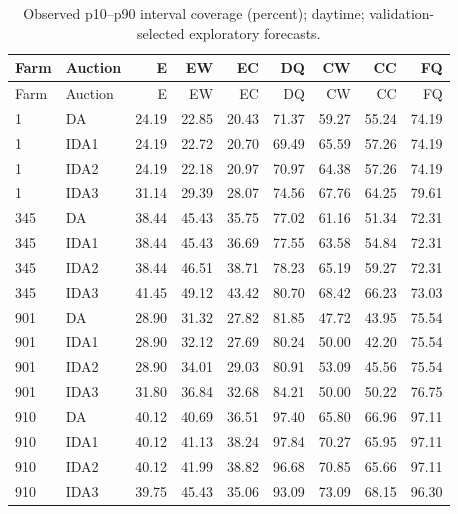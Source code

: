 \documentclass[11pt,a4paper]{article}
\begin{document}
\begin{longtable}{llrrrrrrr}
\caption{Observed p10--p90 interval coverage (percent); daytime; validation-selected exploratory forecasts.}\\
\toprule Farm & Auction & E & EW & EC & DQ & CW & CC & FQ \\
\midrule\endfirsthead
\toprule Farm & Auction & E & EW & EC & DQ & CW & CC & FQ \\
\midrule\endhead
1 & DA & 24.19 & 22.85 & 20.43 & 71.37 & 59.27 & 55.24 & 74.19 \\
1 & IDA1 & 24.19 & 22.72 & 20.70 & 69.49 & 65.59 & 57.26 & 74.19 \\
1 & IDA2 & 24.19 & 22.18 & 20.97 & 70.97 & 64.38 & 57.26 & 74.19 \\
1 & IDA3 & 31.14 & 29.39 & 28.07 & 74.56 & 67.76 & 64.25 & 79.61 \\
\midrule
345 & DA & 38.44 & 45.43 & 35.75 & 77.02 & 61.16 & 51.34 & 72.31 \\
345 & IDA1 & 38.44 & 45.43 & 36.69 & 77.55 & 63.58 & 54.84 & 72.31 \\
345 & IDA2 & 38.44 & 46.51 & 38.71 & 78.23 & 65.19 & 59.27 & 72.31 \\
345 & IDA3 & 41.45 & 49.12 & 43.42 & 80.70 & 68.42 & 66.23 & 73.03 \\
\midrule
901 & DA & 28.90 & 31.32 & 27.82 & 81.85 & 47.72 & 43.95 & 75.54 \\
901 & IDA1 & 28.90 & 32.12 & 27.69 & 80.24 & 50.00 & 42.20 & 75.54 \\
901 & IDA2 & 28.90 & 34.01 & 29.03 & 80.91 & 53.09 & 45.56 & 75.54 \\
901 & IDA3 & 31.80 & 36.84 & 32.68 & 84.21 & 50.00 & 50.22 & 76.75 \\
\midrule
910 & DA & 40.12 & 40.69 & 36.51 & 97.40 & 65.80 & 66.96 & 97.11 \\
910 & IDA1 & 40.12 & 41.13 & 38.24 & 97.84 & 70.27 & 65.95 & 97.11 \\
910 & IDA2 & 40.12 & 41.99 & 38.82 & 96.68 & 70.85 & 65.66 & 97.11 \\
910 & IDA3 & 39.75 & 45.43 & 35.06 & 93.09 & 73.09 & 68.15 & 96.30 \\
\midrule
\bottomrule\end{longtable}
\normalsize
\small
\end{document}
